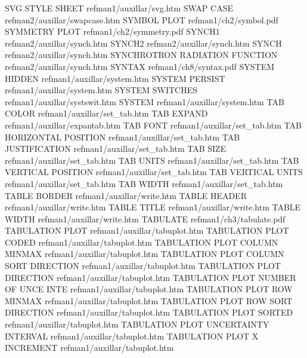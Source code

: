 SVG STYLE SHEET                         refman1/auxillar/svg.htm
SWAP CASE                               refman2/auxillar/swapcase.htm
SYMBOL PLOT                             refman1/ch2/symbol.pdf
SYMMETRY PLOT                           refman1/ch2/symmetry.pdf
SYNCH1                                  refman2/auxillar/synch.htm
SYNCH2                                  refman2/auxillar/synch.htm
SYNCH                                   refman2/auxillar/synch.htm
SYNCHROTRON RADIATION FUNCTION          refman2/auxillar/synch.htm
SYNTAX                                  refman1/ch8/syntax.pdf
SYSTEM HIDDEN                           refman1/auxillar/system.htm
SYSTEM PERSIST                          refman1/auxillar/system.htm
SYSTEM SWITCHES                         refman1/auxillar/systswit.htm
SYSTEM                                  refman1/auxillar/system.htm
TAB COLOR                               refman1/auxillar/set_tab.htm
TAB EXPAND                              refman1/auxillar/expantab.htm
TAB FONT                                refman1/auxillar/set_tab.htm
TAB HORIZONTAL POSITION                 refman1/auxillar/set_tab.htm
TAB JUSTIFICATION                       refman1/auxillar/set_tab.htm
TAB SIZE                                refman1/auxillar/set_tab.htm
TAB UNITS                               refman1/auxillar/set_tab.htm
TAB VERTICAL POSITION                   refman1/auxillar/set_tab.htm
TAB VERTICAL UNITS                      refman1/auxillar/set_tab.htm
TAB WIDTH                               refman1/auxillar/set_tab.htm
TABLE BORDER                            refman1/auxillar/write.htm
TABLE HEADER                            refman1/auxillar/write.htm
TABLE TITLE                             refman1/auxillar/write.htm
TABLE WIDTH                             refman1/auxillar/write.htm
TABULATE                                refman1/ch3/tabulate.pdf
TABULATION PLOT                         refman1/auxillar/tabuplot.htm
TABULATION PLOT CODED                   refman1/auxillar/tabuplot.htm
TABULATION PLOT COLUMN MINMAX           refman1/auxillar/tabuplot.htm
TABULATION PLOT COLUMN SORT DIRECTION   refman1/auxillar/tabuplot.htm
TABULATION PLOT DIRECTION               refman1/auxillar/tabuplot.htm
TABULATION PLOT NUMBER OF UNCE INTE     refman1/auxillar/tabuplot.htm
TABULATION PLOT ROW MINMAX              refman1/auxillar/tabuplot.htm
TABULATION PLOT ROW SORT DIRECTION      refman1/auxillar/tabuplot.htm
TABULATION PLOT SORTED                  refman1/auxillar/tabuplot.htm
TABULATION PLOT UNCERTAINTY INTERVAL    refman1/auxillar/tabuplot.htm
TABULATION PLOT X INCREMENT             refman1/auxillar/tabuplot.htm
